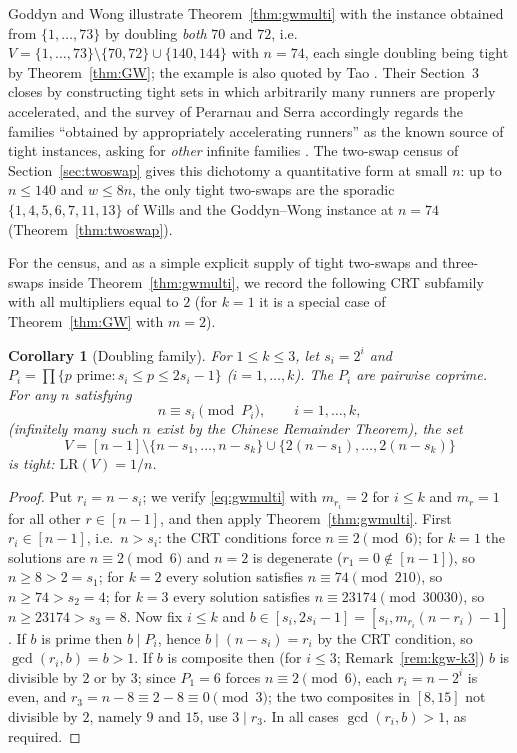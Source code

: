 \documentclass[11pt]{article}
\newtheorem{corollary}[theorem]{Corollary}
\theoremstyle{definition}
\newcommand{\LR}{\mathrm{LR}}
\begin{document}
Goddyn and Wong illustrate Theorem~\ref{thm:gwmulti} with the instance
obtained from $\{1,\dots,73\}$ by doubling \emph{both} $70$ and $72$,
i.e.\ $V=\{1,\dots,73\}\setminus\{70,72\}\cup\{140,144\}$ with $n=74$,
each single doubling being tight by Theorem~\ref{thm:GW}; the example
is also quoted by Tao \cite{Tao2017}.  Their Section~3 closes by
constructing tight sets in which arbitrarily many runners are properly
accelerated, and the survey of Perarnau and Serra accordingly regards
the families ``obtained by appropriately accelerating runners'' as the
known source of tight instances, asking for \emph{other} infinite
families \cite{PerarnauSerra2025}.  The two-swap census of
Section~\ref{sec:twoswap} gives this dichotomy a quantitative form at
small $n$: up to $n\le140$ and $w\le8n$, the only tight two-swaps are
the sporadic $\{1,4,5,6,7,11,13\}$ of Wills \cite{Wills1968} and the
Goddyn--Wong instance at $n=74$ (Theorem~\ref{thm:twoswap}).

For the census, and as a simple explicit supply of tight two-swaps and
three-swaps inside Theorem~\ref{thm:gwmulti}, we record the following
CRT subfamily with all multipliers equal to $2$ (for $k=1$ it is a
special case of Theorem~\ref{thm:GW} with $m=2$).

\begin{corollary}[Doubling family]\label{thm:kgw}
For $1\le k\le3$, let $s_i=2^i$ and
$P_i=\prod\{p\text{ prime}:s_i\le p\le 2s_i-1\}$ ($i=1,\ldots,k$).
The $P_i$ are pairwise coprime. For any $n$ satisfying
\[
n\equiv s_i\pmod{P_i},\qquad i=1,\ldots,k,
\]
(infinitely many such $n$ exist by the Chinese Remainder Theorem), the set
\[
V=[n-1]\setminus\{n-s_1,\ldots,n-s_k\}\cup\{2(n-s_1),\ldots,2(n-s_k)\}
\]
is tight: $\LR(V)=1/n$.
\end{corollary}

\begin{proof}
Put $r_i=n-s_i$; we verify \eqref{eq:gwmulti} with $m_{r_i}=2$ for
$i\le k$ and $m_r=1$ for all other $r\in[n-1]$, and then apply
Theorem~\ref{thm:gwmulti}.  First $r_i\in[n-1]$, i.e.\ $n>s_i$: the
CRT conditions force $n\equiv2\pmod6$; for $k=1$ the solutions are
$n\equiv2\pmod6$ and $n=2$ is degenerate ($r_1=0\notin[n-1]$), so
$n\ge8>2=s_1$; for $k=2$ every solution satisfies $n\equiv74\pmod{210}$,
so $n\ge74>s_2=4$; for $k=3$ every solution satisfies
$n\equiv23174\pmod{30030}$, so $n\ge23174>s_3=8$.  Now fix $i\le k$ and
$b\in[s_i,2s_i-1]=[s_i,m_{r_i}(n-r_i)-1]$.  If $b$ is prime then
$b\mid P_i$, hence $b\mid(n-s_i)=r_i$ by the CRT condition, so
$\gcd(r_i,b)=b>1$.  If $b$ is composite then (for $i\le3$;
Remark~\ref{rem:kgw-k3}) $b$ is divisible by $2$ or by $3$; since
$P_1=6$ forces $n\equiv2\pmod6$, each $r_i=n-2^i$ is even, and
$r_3=n-8\equiv2-8\equiv0\pmod3$; the two composites in $[8,15]$ not
divisible by $2$, namely $9$ and $15$, use $3\mid r_3$.  In all cases
$\gcd(r_i,b)>1$, as required.
\end{proof}
\end{document}
